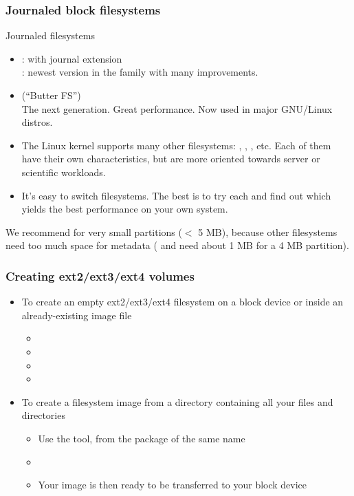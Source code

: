 \begin{frame}
  \frametitle{Journaled block filesystems}
  Journaled filesystems
  \begin{itemize}
  \item {}:  with journal extension\\
    : newest version in the family with many improvements.
  \item {} (``Butter FS'')\\
    The next generation. Great performance. Now used in major
    GNU/Linux distros.
  \item The Linux kernel supports many other filesystems:
    , , , etc.  Each of them have
    their own characteristics, but are more oriented towards server or
    scientific workloads.
  \item It's easy to switch filesystems. The best is to try each
    and find out which yields the best performance on your own system.
  \end{itemize}
  We recommend  for very small partitions ($<$ 5 MB),
  because other filesystems need too much space for metadata
  ( and  need about 1 MB for a 4 MB partition).
\end{frame}

\begin{frame}
  \frametitle{Creating ext2/ext3/ext4 volumes}
  \begin{itemize}
  \item To create an empty ext2/ext3/ext4 filesystem on a block device or
    inside an already-existing image file
    \begin{itemize}
    \item {}
    \item {}
    \item {}
    \item {}
    \end{itemize}
  \item To create a filesystem image from a directory containing all
    your files and directories
    \begin{itemize}
    \item Use the  tool, from the package of the same name
    \item {}
    \item Your image is then ready to be transferred to your block
      device
    \end{itemize}
  \end{itemize}
\end{frame}


